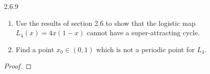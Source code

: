 \begin{problem}{2.6.9}
  \begin{enumerate}
    \item Use the results of section 2.6 to show that the logistic map $L_4(x) = 4x(1-x)$
      cannot have a super-attracting cycle.
    \item Find a point $x_0 \in (0, 1)$ which is not a periodic point for $L_4$.
  \end{enumerate}
\end{problem}

\begin{proof}
\end{proof}
\newpage
